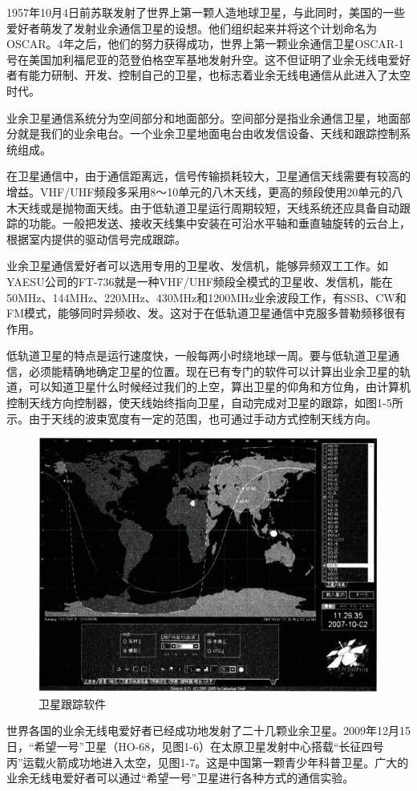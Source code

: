 \documentclass[12pt,UTF8]{ctexbook}
\begin{document}
1957年10月4日前苏联发射了世界上第一颗人造地球卫星，与此同时，美国的一些爱好者萌发了发射业余通信卫星的设想。他们组织起来并将这个计划命名为OSCAR。4年之后，他们的努力获得成功，世界上第一颗业余通信卫星OSCAR-1号在美国加利福尼亚的范登伯格空军基地发射升空。这不但证明了业余无线电爱好者有能力研制、开发、控制自己的卫星，也标志着业余无线电通信从此进入了太空时代。

业余卫星通信系统分为空间部分和地面部分。空间部分是指业余通信卫星，地面部分就是我们的业余电台。一个业余卫星地面电台由收发信设备、天线和跟踪控制系统组成。

在卫星通信中，由于通信距离远，信号传输损耗较大，卫星通信天线需要有较高的增益。VHF/UHF频段多采用8～10单元的八木天线，更高的频段使用20单元的八木天线或是抛物面天线。由于低轨道卫星运行周期较短，天线系统还应具备自动跟踪的功能。一般把发送、接收天线集中安装在可沿水平轴和垂直轴旋转的云台上，根据室内提供的驱动信号完成跟踪。

业余卫星通信爱好者可以选用专用的卫星收、发信机，能够异频双工工作。如YAESU公司的FT-736就是一种VHF/UHF频段全模式的卫星收、发信机，能在50MHz、144MHz、220MHz、430MHz和1200MHz业余波段工作，有SSB、CW和FM模式，能够同时异频收、发。这对于在低轨道卫星通信中克服多普勒频移很有作用。

低轨道卫星的特点是运行速度快，一般每两小时绕地球一周。要与低轨道卫星通信，必须能精确地确定卫星的位置。现在已有专门的软件可以计算出业余卫星的轨道，可以知道卫星什么时候经过我们的上空，算出卫星的仰角和方位角，由计算机控制天线方向控制器，使天线始终指向卫星，自动完成对卫星的跟踪，如图1-5所示。由于天线的波束宽度有一定的范围，也可通过手动方式控制天线方向。

\begin{figure}[htbp]
	\centering
	\includegraphics[width=0.7\linewidth]{5}
	\caption{卫星跟踪软件}
	\label{fig:1}
\end{figure}

世界各国的业余无线电爱好者已经成功地发射了二十几颗业余卫星。2009年12月15日，“希望一号”卫星（HO-68，见图1-6）在太原卫星发射中心搭载“长征四号丙”运载火箭成功地进入太空，见图1-7。这是中国第一颗青少年科普卫星。广大的业余无线电爱好者可以通过“希望一号”卫星进行各种方式的通信实验。
\end{document}
